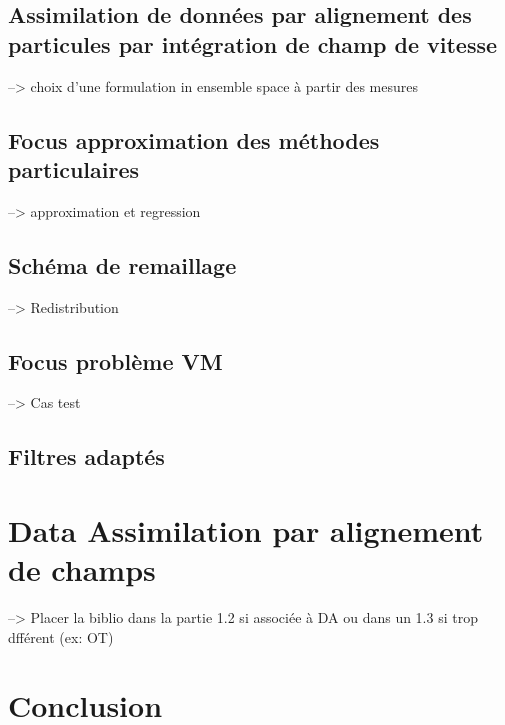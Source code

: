 \documentclass{article}
\begin{document}

\subsection{Assimilation de données par alignement des particules par intégration de champ de vitesse}
--> choix d'une formulation in ensemble space à partir des mesures

\subsection{Focus approximation des méthodes particulaires}
--> approximation et regression

\subsection{Schéma de remaillage}
--> Redistribution

\subsection{Focus problème VM}
--> Cas test

\subsection{Filtres adaptés}

\section{Data Assimilation par alignement de champs}
--> Placer la biblio dans la partie 1.2 si associée à DA ou dans un 1.3 si trop dfférent (ex: OT)

\section{Conclusion}
\end{document}
